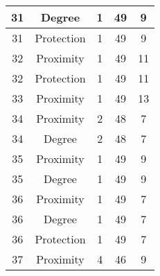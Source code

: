 \documentclass[results.tex]{subfiles}
\begin{document}
\begin{center}
\begin{tabular}{| c || c | c | c | c |}
            \hline
            31                      & Degree                       & 1                      & 49                      & 9                    \\
            \hline
            31                      & Protection                   & 1                      & 49                      & 9                    \\
            \hline
            32                      & Proximity                    & 1                      & 49                      & 11                   \\
            \hline
            32                      & Protection                   & 1                      & 49                      & 11                   \\
            \hline
            33                      & Proximity                    & 1                      & 49                      & 13                   \\
            \hline
            34                      & Proximity                    & 2                      & 48                      & 7                    \\
            \hline
            34                      & Degree                       & 2                      & 48                      & 7                    \\
            \hline
            35                      & Proximity                    & 1                      & 49                      & 9                    \\
            \hline
            35                      & Degree                       & 1                      & 49                      & 9                    \\
            \hline
            36                      & Proximity                    & 1                      & 49                      & 7                    \\
            \hline
            36                      & Degree                       & 1                      & 49                      & 7                    \\
            \hline
            36                      & Protection                   & 1                      & 49                      & 7                    \\
            \hline
            37                      & Proximity                    & 4                      & 46                      & 9                    \\

\end{tabular}
\end{center}
\end{document}
